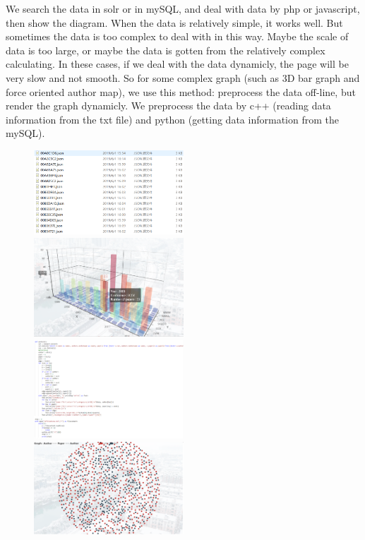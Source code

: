 \documentclass{article}
\begin{document}
	\indent We search the data in solr or in mySQL, and deal with data by php or javascript, then show the diagram. When the data is relatively simple, it works well. But sometimes the data is too complex to deal with in this way. Maybe the scale of data is too large, or maybe the data is gotten from the relatively complex calculating. In these cases, if we deal with the data  dynamicly, the page will be very slow and not smooth. So for some complex graph (such as 3D bar graph and force oriented author map), we use this method: preprocess the data off-line, but render the graph dynamicly. We preprocess the data by c++ (reading data information from the txt file) and python (getting data information from the mySQL).
	\begin{figure}[!h]
		\includegraphics[width=0.5\textwidth]{preprocess.png}
		\includegraphics[width=0.5\textwidth]{threeDbar.png}
		\includegraphics[width=0.5\textwidth]{pythoncode.png}
		\includegraphics[width=0.5\textwidth]{forceorientedauthormap.png}

\end{figure}
\end{document}
